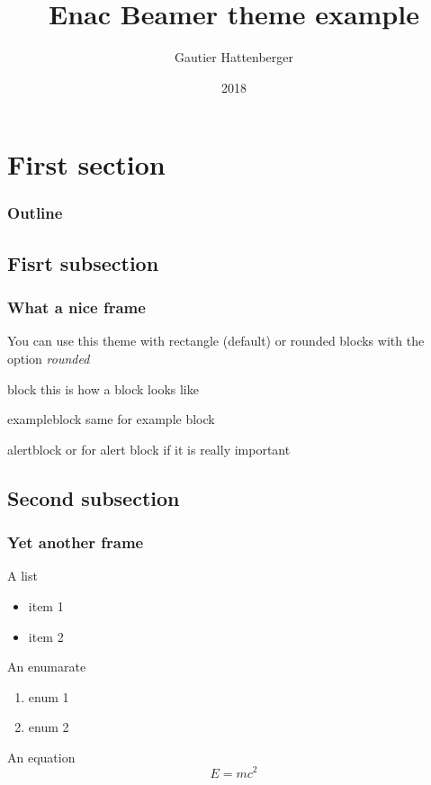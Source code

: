 \documentclass[handout]{beamer}
\author{Gautier Hattenberger}
\title[Enac beamer theme]{Enac Beamer theme example}
\date{2018}
\begin{document}
\maketitle

\section{First section}

\begin{frame}
 \frametitle{Outline}
 \tableofcontents
\end{frame}

\subsection{Fisrt subsection}

\begin{frame}
 \frametitle{What a nice frame}
 
 You can use this theme with rectangle (default) or rounded blocks with the option \emph{rounded}

 \begin{block}{block}
  this is how a block looks like
 \end{block}
 \begin{exampleblock}{exampleblock}
  same for example block
 \end{exampleblock}
 \begin{alertblock}{alertblock}
  or for \alert{alert block} if it is really important
 \end{alertblock}
\end{frame}

\subsection{Second subsection}

\begin{frame}
 \frametitle{Yet another frame}
 A list
 \begin{itemize}
 \item item 1
 \item item 2
 \end{itemize}
 An enumarate
 \begin{enumerate}
  \item enum 1
  \item enum 2
 \end{enumerate}
 An equation
 \begin{displaymath}
  E = mc^2
 \end{displaymath}
\end{frame}
\end{document}
